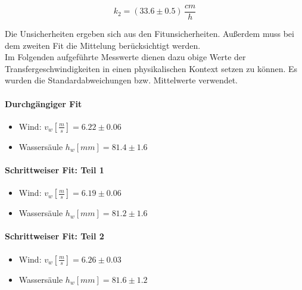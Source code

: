 \documentclass[12pt]{article}
\begin{document}
\begin{equation}
	k_2 = (33.6 \pm 0.5)\, \frac{cm}{h}
\end{equation}

Die Unsicherheiten ergeben sich aus den Fitunsicherheiten. Außerdem muss bei dem zweiten Fit die Mittelung berücksichtigt werden.\\

Im Folgenden aufgeführte Messwerte dienen dazu obige Werte der Transfergeschwindigkeiten in einen physikalischen Kontext setzen zu können. Es wurden die Standardabweichungen bzw. Mittelwerte verwendet.

\paragraph{Durchgängiger Fit}
\begin{itemize}
	\item Wind: $v_w [\frac{m}{s}] = 6.22 \pm 0.06 $
	\item Wassersäule $h_w[mm] = 81.4 \pm 1.6 $
\end{itemize}
\paragraph{Schrittweiser Fit: Teil 1}
\begin{itemize}
	\item Wind: $v_w [\frac{m}{s}] = 6.19 \pm 0.06 $
	\item Wassersäule $h_w[mm] = 81.2 \pm 1.6 $
\end{itemize}
\paragraph{Schrittweiser Fit: Teil 2}
\begin{itemize}
	\item Wind: $v_w [\frac{m}{s}] = 6.26 \pm 0.03 $
	\item Wassersäule $h_w[mm] = 81.6 \pm 1.2 $
\end{itemize}
\end{document}

